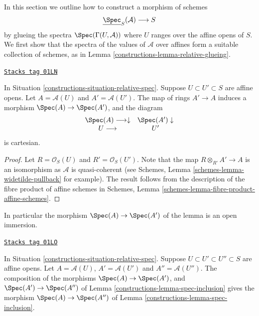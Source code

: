 In this section we outline how to construct a morphism
of schemes
$$
\underline{\Spec}_S(\mathcal{A}) \longrightarrow S
$$
by glueing the spectra $\Spec(\Gamma(U, \mathcal{A}))$
where $U$ ranges over the affine opens of $S$. We first show that the
spectra of the values of $\mathcal{A}$ over affines form a
suitable collection of schemes, as in Lemma \ref{constructions-lemma-relative-glueing}.

\begin{lemma}
\label{constructions-lemma-spec-inclusion}
\href{https://stacks.math.columbia.edu/tag/01LN}{\texttt{Stacks tag 01LN}}

In Situation \ref{constructions-situation-relative-spec}.
Suppose $U \subset U' \subset S$ are affine opens.
Let $A = \mathcal{A}(U)$ and $A' = \mathcal{A}(U')$.
The map of rings $A' \to A$ induces a morphism
$\Spec(A) \to \Spec(A')$, and the diagram
$$
\begin{array}{cc}\Spec(A) \longrightarrow\downarrow & \Spec(A') \downarrow \\ U \longrightarrow & U'\end{array}
$$
is cartesian.
\end{lemma}

\begin{proof}
Let $R = \mathcal{O}_S(U)$ and $R' = \mathcal{O}_S(U')$.
Note that the map $R \otimes_{R'} A' \to A$ is an isomorphism as
$\mathcal{A}$ is quasi-coherent
(see Schemes, Lemma \ref{schemes-lemma-widetilde-pullback} for example).
The result follows from the description of the fibre product of
affine schemes in
Schemes, Lemma \ref{schemes-lemma-fibre-product-affine-schemes}.
\end{proof}

In particular the morphism $\Spec(A) \to \Spec(A')$
of the lemma is an open immersion.

\begin{lemma}
\label{constructions-lemma-transitive-spec}
\href{https://stacks.math.columbia.edu/tag/01LO}{\texttt{Stacks tag 01LO}}

In Situation \ref{constructions-situation-relative-spec}.
Suppose $U \subset U' \subset U'' \subset S$ are affine opens.
Let $A = \mathcal{A}(U)$, $A' = \mathcal{A}(U')$ and $A'' = \mathcal{A}(U'')$.
The composition of the morphisms
$\Spec(A) \to \Spec(A')$, and
$\Spec(A') \to \Spec(A'')$ of
Lemma \ref{constructions-lemma-spec-inclusion} gives the
morphism $\Spec(A) \to \Spec(A'')$
of Lemma \ref{constructions-lemma-spec-inclusion}.
\end{lemma}

